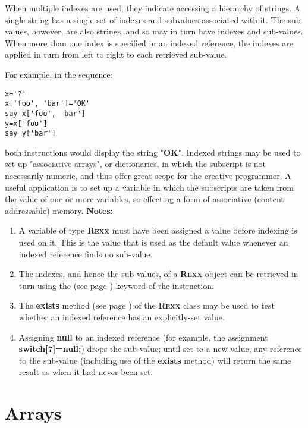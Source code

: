 When multiple indexes are used, they indicate accessing a hierarchy of
strings.  A single \nr{} string has a single set of indexes and
subvalues associated with it.  The sub-values, however, are also \nr{}
strings, and so may in turn have indexes and sub-values.  When more than
one index is specified in an indexed reference, the indexes are applied
in turn from left to right to each retrieved sub-value.
 
For example, in the sequence:
\begin{lstlisting}
x='?'
x['foo', 'bar']='OK'
say x['foo', 'bar']
y=x['foo']
say y['bar']
\end{lstlisting}
both  instructions would display the string
"\textbf{OK}".
 Indexed strings may be used to set up "associative arrays", or
dictionaries, in which the subscript is not necessarily numeric, and
thus offer great scope for the creative programmer.
A useful application is to set up a variable in which the subscripts
are taken from the value of one or more variables, so effecting a form
of associative (content addressable) memory.
 \textbf{Notes:}
\begin{enumerate}
\item 
A variable of type \textbf{R\textsc{exx}} must have been assigned a value
before indexing is used on it.
This is the value that is used as the default value whenever an indexed
reference finds no sub-value.
\item 
The indexes, and hence the sub-values, of a \textbf{R\textsc{exx}} object can
be retrieved in turn using the   (see page \pageref{refloopov})  keyword
of the  instruction.
\item 
The  \textbf{exists} method (see page \pageref{refexists})  of the \textbf{R\textsc{exx}}
class may be used to test whether an indexed reference has an
explicitly-set value.
\item 
Assigning \textbf{null} to an indexed reference (for example, the
assignment \textbf{switch[7]=null;}) drops the sub-value;
until set to a new value, any reference to the sub-value (including use
of the \textbf{exists} method) will return the same result as
when it had never been set.
\end{enumerate}
\section{Arrays}\label{refarray}
 
